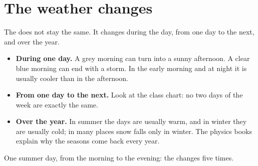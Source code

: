 \section{The weather changes}

The  does not stay the same. It changes during the day, from one day
to the next, and over the year.

\begin{itemize}
  \item \textbf{During one day.} A grey morning can turn into a sunny
        afternoon. A clear blue morning can end with a storm. In the early
        morning and at night it is usually cooler than in the afternoon.
  \item \textbf{From one day to the next.} Look at the class chart: no two
        days of the week are exactly the same.
  \item \textbf{Over the year.} In summer the days are usually warm, and in
        winter they are usually cold; in many places snow falls only in
        winter. The physics books explain why the seasons come back every
        year.
\end{itemize}

\begin{omfigure}

{\small One summer day, from the morning to the evening: the  changes
five times.}
\label{fig:g1:watching-the-weather:day}
\end{omfigure}

